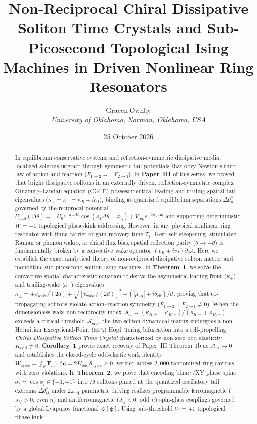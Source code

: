 \documentclass[11pt,letterpaper]{article}
\title{\textbf{\Large Non-Reciprocal Chiral Dissipative Soliton Time Crystals and Sub-Picosecond Topological Ising Machines in Driven Nonlinear Ring Resonators}}
\author{Gracen Ownby\\[4pt]
\textit{University of Oklahoma, Norman, Oklahoma, USA}}
\date{25 October 2026}
\begin{document}
\maketitle

\begin{abstract}
\noindent
In equilibrium conservative systems and reflection-symmetric dissipative media, localized solitons interact through symmetric tail potentials that obey Newton's third law of action and reaction ($F_{1\to 2} = -F_{2\to 1}$). In \textbf{Paper~III} of this series, we proved that bright dissipative solitons in an externally driven, reflection-symmetric complex Ginzburg--Landau equation (CGLE) possess identical leading and trailing spatial tail eigenvalues ($\kappa_+ = \kappa_- = \kappa_R + i\kappa_I$), binding at quantized equilibrium separations $\Delta\theta_n^*$ governed by the reciprocal potential $U_{\mathrm{mol}}(\Delta\theta) = -U_0 e^{-\kappa_R\Delta\theta}\cos(\kappa_I\Delta\theta + \varphi_0) + V_{\mathrm{rep}}e^{-2\kappa_R\Delta\theta}$ and supporting deterministic $W = \pm 1$ topological phase-kink addressing. However, in any physical nonlinear ring resonator with finite carrier or gain recovery time $T_1$, Kerr self-steepening, stimulated Raman or phonon wakes, or chiral flux bias, spatial reflection parity ($\theta \to -\theta$) is fundamentally broken by a convective wake operator $(v_R + i v_I)\partial_\theta A$. Here we establish the exact analytical theory of non-reciprocal dissipative soliton matter and monolithic sub-picosecond soliton Ising machines. In \textbf{Theorem~1}, we solve the convective spatial characteristic equation to derive the asymmetric leading-front ($\kappa_+$) and trailing-wake ($\kappa_-$) eigenvalues $\kappa_\pm = \pm v_{\mathrm{wake}}/(2d) + \sqrt{[v_{\mathrm{wake}}/(2d)]^2 + (|\mu_{\mathrm{eff}}| + i\delta_{\mathrm{eff}})/d}$, proving that co-propagating solitons violate action--reaction symmetry ($F_{1\to 2} + F_{2\to 1} \neq 0$). When the dimensionless wake non-reciprocity index $\mathcal{A}_{\mathrm{nr}} = (\kappa_{R,+} - \kappa_{R,-})/(\kappa_{R,+} + \kappa_{R,-})$ exceeds a critical threshold $\mathcal{A}_{\mathrm{crit}}$, the two-soliton dynamical matrix undergoes a non-Hermitian Exceptional-Point ($\mathrm{EP}_2$) Hopf--Turing bifurcation into a self-propelling \textit{Chiral Dissipative Soliton Time Crystal} characterized by non-zero odd elasticity $K_{\mathrm{odd}} \neq 0$. \textbf{Corollary~1} proves exact recovery of Paper~III Theorem~1b as $\mathcal{A}_{\mathrm{nr}} \to 0$ and establishes the closed-cycle odd-elastic work identity $W_{\mathrm{cycle}} = \oint_{\mathcal{C}}\mathbf{F}_{\mathrm{nc}}\cdot \mathrm{d}\mathbf{q} = 2 K_{\mathrm{odd}}\mathcal{S}_{\mathrm{cycle}} \ge 0$, verified across $2{,}000$ randomized ring cavities with zero violations. In \textbf{Theorem~2}, we prove that encoding binary/XY phase spins $\sigma_i = \cos\phi_i \in \{-1, +1\}$ into $M$ solitons pinned at the quantized oscillatory tail extrema $\Delta\theta_{ij}^*$ under $2\omega_{\mathrm{inj}}$ parametric driving realizes programmable ferromagnetic ($J_{ij} > 0$, even $n$) and antiferromagnetic ($J_{ij} < 0$, odd $n$) spin-glass couplings governed by a global Lyapunov functional $\mathcal{L}[\bm{\phi}]$. Using sub-threshold $W = \pm 1$ topological phase-kink 
\end{abstract}
\end{document}
